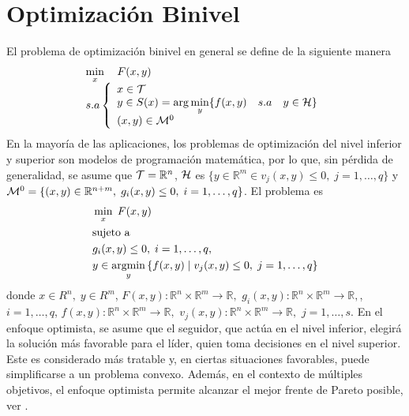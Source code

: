 \section{Optimización Binivel }
El problema de optimización binivel en general se define de la siguiente manera \begin{equation} \label{eq:Def1Binivel}
    \begin{array}{l}
      \displaystyle \min_{x} \quad F(x, y)\\
        s.a \left\{ \begin{array}{l}
            x \in \cal{T} \\
             y \in S(x) = \arg \displaystyle  \min_{y} \{ f(x, y) \quad s.a \quad y \in  \cal{H}\}\\
            (x,y) \in {\cal{M}}^0 
        \end{array}\right.
        \end{array} \end{equation}
En la mayoría de las aplicaciones, los problemas de optimización del nivel inferior y superior son modelos de programación matemática, por lo  que, sin pérdida de generalidad, se asume que  ${\cal{T}}=\mathbb{R}^n$,  $\cal{H}$ es  $\{y\in \mathbb{R}^m\in v_j(x, y)\leq 0,\;j=1,\ldots,q\}$  y
  ${\cal{M}}^0=\{(x,y)\in\mathbb{R}^{n+m},\;g_i(x, y)\leq 0,\;i=1,\ldots,q\}$. El problema es  
\begin{equation}
\begin{aligned}
& \min_{x} \; F(x, y) \\
& \text{sujeto a } \\
& g_i(x, y)\leq 0,\;i=1,\ldots,q, \\
& y \in \operatorname*{argmin}_{y} \left\{ f(x, y) \mid v_j(x, y)\leq 0,\;j=1,\ldots,q \right\}
\end{aligned}
\label{eq:ProblemaGeneral}
\end{equation}
donde 
$    x \in R^{n},\; y \in R^{m}$, $ F(x,y) : \mathbb{R}^{n} \times \mathbb{R}^{m} \to \mathbb{R},$ $ g_i(x,y)  : \mathbb{R}^{n} \times \mathbb{R}^{m} \to \mathbb{R} ,$, $i=1,\ldots, q$,  $f(x,y) : \mathbb{R}^{n} \times \mathbb{R}^{m} \to \mathbb{R},$  $v_j(x,y)  : \mathbb{R}^{n} \times \mathbb{R}^{m} \to \mathbb{R} ,$ $j=1,\ldots, s$.
En el enfoque optimista, se asume que el seguidor, que actúa en el nivel inferior, elegirá la solución más favorable para el líder, quien toma decisiones en el nivel superior. Este es considerado más tratable y, en ciertas situaciones favorables, puede simplificarse a un problema convexo. Además, en el contexto de múltiples objetivos, el enfoque optimista permite alcanzar el mejor frente de Pareto posible, ver \cite{DempeyZemkoho2020}.

